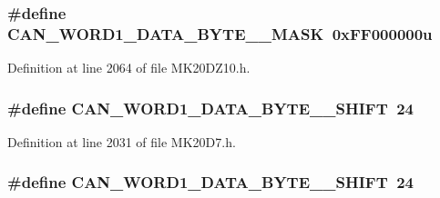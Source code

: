 \subsubsection[{\texorpdfstring{C\+A\+N\+\_\+\+W\+O\+R\+D1\+\_\+\+D\+A\+T\+A\+\_\+\+B\+Y\+T\+E\+\_\+4\+\_\+\+M\+A\+SK}{CAN_WORD1_DATA_BYTE_4_MASK}}]{\setlength{\rightskip}{0pt plus 5cm}\#define C\+A\+N\+\_\+\+W\+O\+R\+D1\+\_\+\+D\+A\+T\+A\+\_\+\+B\+Y\+T\+E\+\_\+\_\+\+M\+A\+SK~0x\+F\+F000000u}\hypertarget{group___c_a_n___register___masks_ga9330617952319833e6c0ccf8d115144b}{}\label{group___c_a_n___register___masks_ga9330617952319833e6c0ccf8d115144b}


Definition at line 2064 of file M\+K20\+D\+Z10.\+h.

\subsubsection[{\texorpdfstring{C\+A\+N\+\_\+\+W\+O\+R\+D1\+\_\+\+D\+A\+T\+A\+\_\+\+B\+Y\+T\+E\+\_\+4\+\_\+\+S\+H\+I\+FT}{CAN_WORD1_DATA_BYTE_4_SHIFT}}]{\setlength{\rightskip}{0pt plus 5cm}\#define C\+A\+N\+\_\+\+W\+O\+R\+D1\+\_\+\+D\+A\+T\+A\+\_\+\+B\+Y\+T\+E\+\_\+\_\+\+S\+H\+I\+FT~24}\hypertarget{group___c_a_n___register___masks_gaa7615281b358dfed5fb817b9c1fb157e}{}\label{group___c_a_n___register___masks_gaa7615281b358dfed5fb817b9c1fb157e}


Definition at line 2031 of file M\+K20\+D7.\+h.

\subsubsection[{\texorpdfstring{C\+A\+N\+\_\+\+W\+O\+R\+D1\+\_\+\+D\+A\+T\+A\+\_\+\+B\+Y\+T\+E\+\_\+4\+\_\+\+S\+H\+I\+FT}{CAN_WORD1_DATA_BYTE_4_SHIFT}}]{\setlength{\rightskip}{0pt plus 5cm}\#define C\+A\+N\+\_\+\+W\+O\+R\+D1\+\_\+\+D\+A\+T\+A\+\_\+\+B\+Y\+T\+E\+\_\+\_\+\+S\+H\+I\+FT~24}\hypertarget{group___c_a_n___register___masks_gaa7615281b358dfed5fb817b9c1fb157e}{}\label{group___c_a_n___register___masks_gaa7615281b358dfed5fb817b9c1fb157e}


